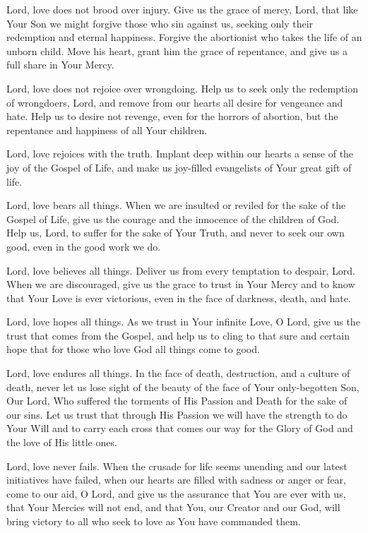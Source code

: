 \documentclass[12pt]{article}
\begin{document}
Lord, love does not brood over injury.
Give us the grace of mercy, Lord, that like Your Son we might forgive those who sin against us, seeking only their redemption and eternal happiness.
Forgive the abortionist who takes the life of an unborn child.
Move his heart, grant him the grace of repentance, and give us a full share in Your Mercy.

Lord, love does not rejoice over wrongdoing.
Help us to seek only the redemption of wrongdoers, Lord, and remove from our hearts all desire for vengeance and hate.
Help us to desire not revenge, even for the horrors of abortion, but the repentance and happiness of all Your children.

Lord, love rejoices with the truth.
Implant deep within our hearts a sense of the joy of the Gospel of Life, and make us joy-filled evangelists of Your great gift of life.

Lord, love bears all things.
When we are insulted or reviled for the sake of the Gospel of Life, give us the courage and the innocence of the children of God.
Help us, Lord, to suffer for the sake of Your Truth, and never to seek our own good, even in the good work we do.

Lord, love believes all things.
Deliver us from every temptation to despair, Lord. When we are discouraged, give us the grace to trust in Your Mercy and to know that Your Love is ever victorious, even in the face of darkness, death, and hate.

Lord, love hopes all things.
As we trust in Your infinite Love, O Lord, give us the trust that comes from the Gospel, and help us to cling to that sure and certain hope that for those who love God all things come to good.

Lord, love endures all things.
In the face of death, destruction, and a culture of death, never let us lose sight of the beauty of the face of Your only-begotten Son, Our Lord, Who suffered the torments of His Passion and Death for the sake of our sins.
Let us trust that through His Passion we will have the strength to do Your Will and to carry each cross that comes our way for the Glory of God and the love of His little ones.

Lord, love never fails.
When the crusade for life seems unending and our latest initiatives have failed, when our hearts are filled with sadness or anger or fear, come to our aid, O Lord, and give us the assurance that You are ever with us, that Your Mercies will not end, and that You, our Creator and our God, will bring victory to all who seek to love as You have commanded them.
\end{document}
